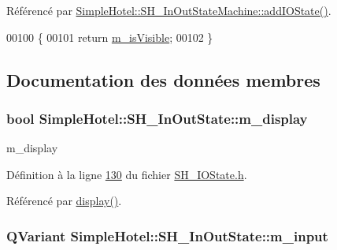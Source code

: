 Référencé par \hyperlink{classSimpleHotel_1_1SH__InOutStateMachine_a07ae9f1f74a9a41b26e77a014679a33e}{Simple\-Hotel\-::\-S\-H\-\_\-\-In\-Out\-State\-Machine\-::add\-I\-O\-State()}.


\begin{DoxyCode}
00100                                \{
00101     \textcolor{keywordflow}{return} \hyperlink{classSimpleHotel_1_1SH__InOutState_a041ad53f3cdfb1b18ee002597e833848}{m\_isVisible};
00102 \}
\end{DoxyCode}


\subsection{Documentation des données membres}
\hypertarget{classSimpleHotel_1_1SH__InOutState_a219039bbe5e46a91dfd7aa51fb530ae4}{
\subsubsection[{m\-\_\-display}]{\setlength{\rightskip}{0pt plus 5cm}bool Simple\-Hotel\-::\-S\-H\-\_\-\-In\-Out\-State\-::m\-\_\-display\hspace{0.3cm}{\ttfamily [private]}}}\label{classSimpleHotel_1_1SH__InOutState_a219039bbe5e46a91dfd7aa51fb530ae4}


m\-\_\-display 



Définition à la ligne \hyperlink{SH__IOState_8h_source_l00130}{130} du fichier \hyperlink{SH__IOState_8h_source}{S\-H\-\_\-\-I\-O\-State.\-h}.



Référencé par \hyperlink{classSimpleHotel_1_1SH__InOutState_a1cbe5befe4f42e0941165498ed0117a9}{display()}.

\hypertarget{classSimpleHotel_1_1SH__InOutState_a7d352dcee656801359ae973726fabc4f}{
\subsubsection[{m\-\_\-input}]{\setlength{\rightskip}{0pt plus 5cm}Q\-Variant Simple\-Hotel\-::\-S\-H\-\_\-\-In\-Out\-State\-::m\-\_\-input\hspace{0.3cm}{\ttfamily [private]}}}\label{classSimpleHotel_1_1SH__InOutState_a7d352dcee656801359ae973726fabc4f}



